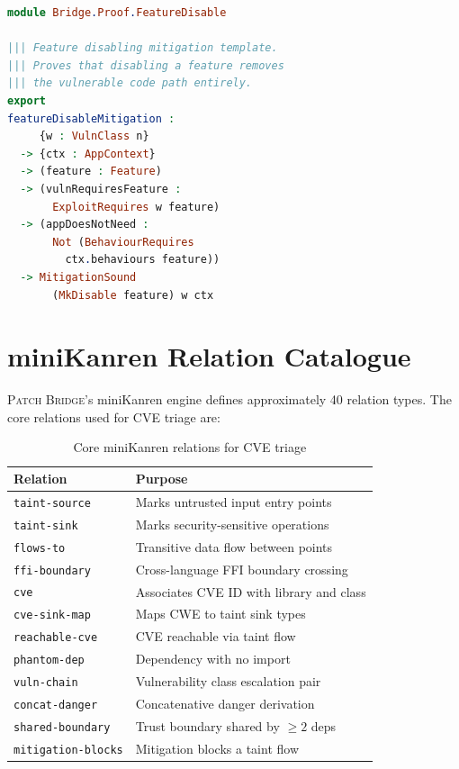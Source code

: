 \documentclass[11pt,twocolumn]{article}
\begin{document}
\begin{lstlisting}[language=Idris,caption={Feature disabling proof template},label=lst:app-feature]
module Bridge.Proof.FeatureDisable

||| Feature disabling mitigation template.
||| Proves that disabling a feature removes
||| the vulnerable code path entirely.
export
featureDisableMitigation :
     {w : VulnClass n}
  -> {ctx : AppContext}
  -> (feature : Feature)
  -> (vulnRequiresFeature :
       ExploitRequires w feature)
  -> (appDoesNotNeed :
       Not (BehaviourRequires
         ctx.behaviours feature))
  -> MitigationSound
       (MkDisable feature) w ctx
\end{lstlisting}

\section{miniKanren Relation Catalogue}
\label{app:relations}

\textsc{Patch Bridge}'s miniKanren engine defines approximately 40
relation types. The core relations used for CVE triage are:

\begin{table}[h]
\centering
\small
\caption{Core miniKanren relations for CVE triage}
\label{tab:relations}
\begin{tabular}{@{}ll@{}}
\toprule
\textbf{Relation} & \textbf{Purpose} \\
\midrule
\texttt{taint-source} & Marks untrusted input entry points \\
\texttt{taint-sink} & Marks security-sensitive operations \\
\texttt{flows-to} & Transitive data flow between points \\
\texttt{ffi-boundary} & Cross-language FFI boundary crossing \\
\texttt{cve} & Associates CVE ID with library and class \\
\texttt{cve-sink-map} & Maps CWE to taint sink types \\
\texttt{reachable-cve} & CVE reachable via taint flow \\
\texttt{phantom-dep} & Dependency with no import \\
\texttt{vuln-chain} & Vulnerability class escalation pair \\
\texttt{concat-danger} & Concatenative danger derivation \\
\texttt{shared-boundary} & Trust boundary shared by $\geq 2$ deps \\
\texttt{mitigation-blocks} & Mitigation blocks a taint flow \\
\bottomrule
\end{tabular}
\end{table}
\end{document}
